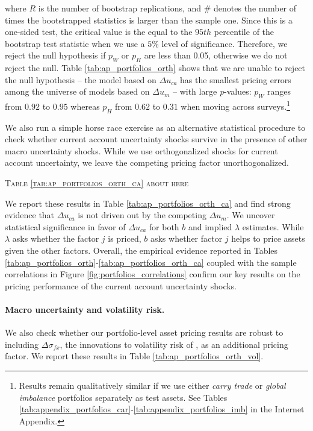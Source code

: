 where $R$ is the number of bootstrap replications, and $\#$ denotes the number of times the bootstrapped statistics is larger than the sample one. Since this is a one-sided test, the critical value is the equal to the $95th$ percentile of the bootstrap test statistic when we use a $5\%$ level of significance. Therefore, we reject the null hypothesis if $p_W$ or $p_H$ are less than 0.05, otherwise we do not reject the null. Table \ref{tab:ap_portfolios_orth} shows that we are unable to reject the null hypothesis -- the model based on $\Delta u_{ca}$ has the smallest pricing errors among the universe of models based on $\Delta u_{m}$ -- with large \emph{p}-values: $p_W$ ranges from $0.92$ to $0.95$ whereas $p_H$ from $0.62$ to $0.31$ when moving across surveys.\footnote{Results remain qualitatively similar if we use either \emph{carry trade} or \emph{global imbalance} portfolios separately as test assets. See Tables \ref{tab:appendix_portfolios_car}-\ref{tab:appendix_portfolios_imb} in the Internet Appendix.}

We also run a simple horse race exercise as an alternative statistical procedure to check whether current account uncertainty shocks survive in the presence of other macro uncertainty shocks. While we use orthogonalized shocks for current account uncertainty, we leave the competing pricing factor unorthogonalized.

\begin{center}
\textsc{Table \ref{tab:ap_portfolios_orth_ca} about here}
\end{center}
We report these results in Table \ref{tab:ap_portfolios_orth_ca} and find strong evidence that $\Delta u_{ca}$ is not driven out by the competing $\Delta u_{m}$. We uncover statistical significance in favor of $\Delta u_{ca}$ for both $b$ and implied $\lambda$ estimates. While $\lambda$ asks whether the factor $j$ is priced, $b$ asks whether factor $j$ helps to price assets given the other factors. Overall, the empirical evidence reported in Tables \ref{tab:ap_portfolios_orth}-\ref{tab:ap_portfolios_orth_ca} coupled with the sample correlations in Figure \ref{fig:portfolios_correlations} confirm our key results on the pricing performance of the current account uncertainty shocks. %

\paragraph{Macro uncertainty and volatility risk.}
We also check whether our portfolio-level asset pricing results are robust to including  $\Delta \sigma_{fx}$, the innovations to volatility risk of \citet{menkhoff_etal2012}, as an additional pricing factor. We report these results in Table \ref{tab:ap_portfolios_orth_vol}.

